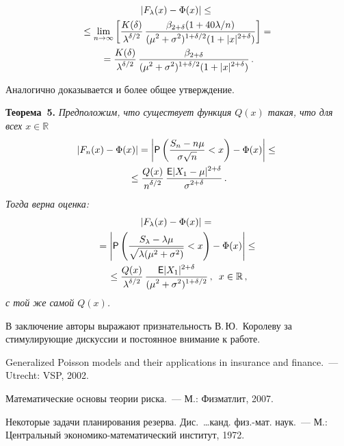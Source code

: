 \begin{multicols}{2}
\noindent
\begin{multline*}
|F_\lambda(x) - \Phi(x)|\le {}\\
{}\le \lim_{n\rightarrow\infty}\left[
\displaystyle\frac{\displaystyle K(\delta)\mathstrut}{\displaystyle \lambda^{\delta/2}\mathstrut}\, 
\displaystyle\frac{\displaystyle \beta_{2+\delta}(1+40{\lambda}/{n})\mathstrut}{\displaystyle (\mu^2+\sigma^2)^{1+\delta/2}(1+|x|^{2+\delta})\mathstrut}\right] ={}\\
{}
=\displaystyle\frac{\displaystyle K(\delta)\mathstrut}{\displaystyle \lambda^{\delta/2}\mathstrut}\,\displaystyle\frac{\displaystyle \beta_{2+\delta}\mathstrut}{\displaystyle (\mu^2+\sigma^2)^{1+\delta/2}(1+|x|^{2+\delta})\mathstrut}\,.
\end{multline*}

    \medskip

  Аналогично доказывается и более общее утверж\-де\-ние.

  \medskip

\noindent
\textbf{Теорема~5.} \textit{Предположим, что существует функция
$Q(x)$ такая, что для всех $x\in\mathbb{R}$}
\begin{multline*}
\left|F_n(x) - \Phi(x)\right| =\left| {{\sf P}}\left(\displaystyle\frac{\displaystyle S_n-n\mu\mathstrut}{\displaystyle \sigma\sqrt{n}\mathstrut}<x\right)- \Phi(x)\right|\le {}\\
{}\le
\displaystyle\frac{\displaystyle Q(x)\mathstrut}{\displaystyle n^{\delta/2}\mathstrut}\, \displaystyle\frac{\displaystyle {{\sf E}}|X_1 - \mu|^{2+\delta}\mathstrut}{\displaystyle \sigma^{2+\delta}\mathstrut}\,.
\end{multline*}
\textit{Тогда верна оценка:}
\begin{multline*}
\left|F_\lambda(x) - \Phi(x)\right| ={}\\
{}=\left|
{{\sf P}}\left(\displaystyle\frac{\displaystyle S_\lambda-\lambda\mu\mathstrut}{\displaystyle \sqrt{\lambda(\mu^2+\sigma^2)}\mathstrut}<x\right)-
\Phi(x)\right|\le{}\\
{}\le \displaystyle\frac{\displaystyle Q(x)\mathstrut}{\displaystyle \lambda^{\delta/2}\mathstrut}\,
\displaystyle\frac{\displaystyle {{\sf E}}|X_1|^{2+\delta}\mathstrut}{\displaystyle (\mu^2+\sigma^2)^{1+\delta/2}\mathstrut}\,,\enskip
x\in\mathbb{R}\,,
\end{multline*}
\textit{с той же самой $Q(x)$.}

  \bigskip
  В заключение авторы выражают признательность В.\,Ю.~Королеву за 
  стимулирующие дискуссии и постоянное внимание к работе.

{\small\frenchspacing
{%
\begin{thebibliography}{99}

  Generalized Poisson models and their
applications in insurance and finance.~--- Utrecht: VSP, 2002.

 Математические
основы теории риска.~--- М.: Физматлит, 2007.

 Некоторые задачи планирования резерва. Дис.\ \ldots канд. физ.-мат. наук.~--- М.: Центральный
эко\-но\-ми\-ко-ма\-те\-ма\-ти\-че\-ский институт, 1972.


\end{thebibliography}}}
\end{multicols}

